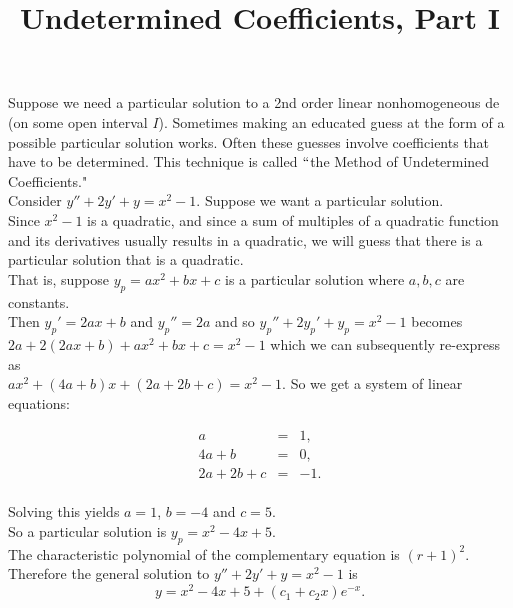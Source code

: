 \documentclass{ximera}
\begin{document}
\begin{abstract}
 \end{abstract}

    \title{Undetermined Coefficients, Part I}
    
    \maketitle

 Suppose we need a particular solution to a 2nd order linear nonhomogeneous de (on some open interval $I$).  Sometimes making an educated guess at the form of a possible particular solution works.  Often these guesses involve coefficients that have to be determined.  This technique is called $``$the Method of Undetermined Coefficients."\\

 Consider $y''+2y'+y=x^2-1$.  Suppose we want a particular solution.\\


Since $x^2-1$ is a quadratic, and since a sum of multiples of a quadratic function and its derivatives usually results in a quadratic, we will guess that there is a particular solution that is a quadratic.  \\

 That is, suppose $y_p=ax^2+bx+c$ is a particular solution where $a,b,c$ are constants.\\

 Then $y_p'=2ax+b$ and $y_p''=2a$ and so $y_p''+2y_p'+y_p=x^2-1$ becomes \\$2a+2(2ax+b)+ax^2+bx+c=x^2-1$ which we can subsequently re-express as \\ $ax^2+(4a+b)x+(2a+2b+c)=x^2-1$.  So we get a system of linear equations:

 \begin{eqnarray*}
  a &=& 1, \\
  4a+b &=& 0, \\
  2a+2b+c &=& -1.\\
 \end{eqnarray*}

 Solving this yields $a=1$, $b=-4$ and $c=5$.\\

 So a particular solution is $y_p=x^2-4x+5$.\\

 The characteristic polynomial of the complementary equation is $(r+1)^2$.  Therefore the general solution to  $y''+2y'+y=x^2-1$ is $$y=x^2-4x+5+(c_1+c_2 x)e^{-x}.$$
\end{document}
